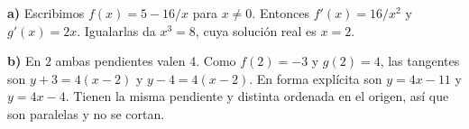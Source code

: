 \textbf{a)} Escribimos $f(x)=5-16/x$ para $x\ne0$.
Entonces $f'(x)=16/x^2$ y $g'(x)=2x$.
Igualarlas da $x^3=8$, cuya solución real es $\boxed{x=2}$.

\textbf{b)} En $2$ ambas pendientes valen 4. Como $f(2)=-3$
y $g(2)=4$, las tangentes son $y+3=4(x-2)$ y $y-4=4(x-2)$.
En forma explícita son $\boxed{y=4x-11}$ y $\boxed{y=4x-4}$.
Tienen la misma pendiente y distinta ordenada en el origen,
así que son paralelas y no se cortan.
